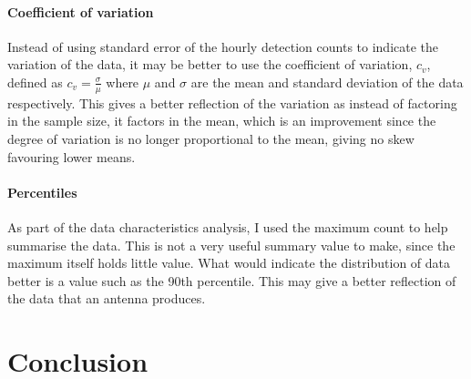 \paragraph{Coefficient of variation\\} 
Instead of using standard error of the hourly detection counts to indicate the variation of the data, it may be better to use the coefficient of variation, $c_v$, defined as $c_v = \frac{\sigma}{\mu}$ where $\mu$ and $\sigma$ are the mean and standard deviation of the data respectively. This gives a better reflection of the variation as instead of factoring in the sample size, it factors in the mean, which is an improvement since the degree of variation is no longer proportional to the mean, giving no skew favouring lower means.
\paragraph{Percentiles\\}
As part of the data characteristics analysis, I used the maximum count to help summarise the data. This is not a very useful summary value to make, since the maximum itself holds little value. What would indicate the distribution of data better is a value such as the 90th percentile. This may give a better reflection of the data that an antenna produces.
\section{Conclusion}